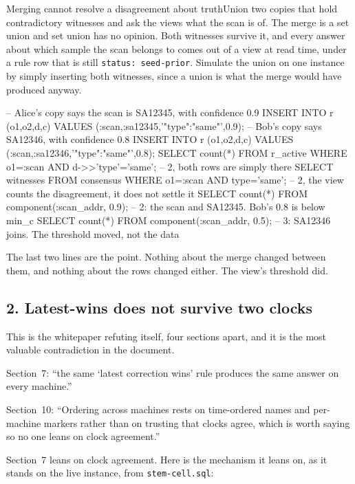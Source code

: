 \begin{Correspondence}{Merging cannot resolve a disagreement about truth}{Union two copies that hold contradictory witnesses and ask the views what the scan is of.}
The merge is a set union and set union has no opinion. Both witnesses survive it, and every answer about which sample the scan belongs to comes out of a view at read time, under a rule row that is still \texttt{status: seed-prior}. Simulate the union on one instance by simply inserting both witnesses, since a union is what the merge would have produced anyway.
\begin{Check}
-- Alice's copy says the scan is SA12345, with confidence 0.9
INSERT INTO r (o1,o2,d,c) VALUES (:scan,:sa12345,'{"type":"same"}',0.9);
-- Bob's copy says SA12346, with confidence 0.8
INSERT INTO r (o1,o2,d,c) VALUES (:scan,:sa12346,'{"type":"same"}',0.8);
SELECT count(*) FROM r_active WHERE o1=:scan AND d->>'type'='same';   -- 2, both rows are simply there
SELECT witnesses FROM consensus WHERE o1=:scan AND type='same';      -- 2, the view counts the disagreement, it does not settle it
SELECT count(*) FROM component(:scan_addr, 0.9);   -- 2: the scan and SA12345. Bob's 0.8 is below min_c
SELECT count(*) FROM component(:scan_addr, 0.5);   -- 3: SA12346 joins. The threshold moved, not the data
\end{Check}
The last two lines are the point. Nothing about the merge changed between them, and nothing about the rows changed either. The view's threshold did.
\end{Correspondence}

\subsection{2. Latest-wins does not survive two clocks}\label{sec:latest-wins}

This is the whitepaper refuting itself, four sections apart, and it is the most valuable contradiction in the document.

Section~7: ``the same `latest correction wins' rule produces the same answer on every machine.''

Section~10: ``Ordering across machines rests on time-ordered names and per-machine markers rather than on trusting that clocks agree, which is worth saying so no one leans on clock agreement.''

Section~7 leans on clock agreement. Here is the mechanism it leans on, as it stands on the live instance, from \texttt{stem-cell.sql}:

